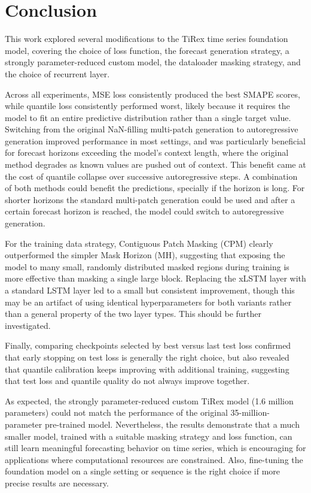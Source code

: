 \documentclass[a4paper,oneside,10pt,ngerman,english]{scrartcl}
\begin{document}
\section{Conclusion}
\label{sec:conclusion}
This work explored several modifications to the TiRex time series foundation model, covering the choice of loss function, the forecast generation strategy, a strongly parameter-reduced custom model, the dataloader masking strategy, and the choice of recurrent layer.

Across all experiments, MSE loss consistently produced the best SMAPE scores, while quantile loss consistently performed worst, likely because it requires the model to fit an entire predictive distribution rather than a single target value. Switching from the original NaN-filling multi-patch generation to autoregressive generation improved performance in most settings, and was particularly beneficial for forecast horizons exceeding the model's context length, where the original method degrades as known values are pushed out of context. This benefit came at the cost of quantile collapse over successive autoregressive steps. A combination of both methods could benefit the predictions, specially if the horizon is long. For shorter horizons the standard multi-patch generation could be used and after a certain forecast horizon is reached, the model could switch to autoregressive generation.

For the training data strategy, Contiguous Patch Masking (CPM) clearly outperformed the simpler Mask Horizon (MH), suggesting that exposing the model to many small, randomly distributed masked regions during training is more effective than masking a single large block. Replacing the xLSTM layer with a standard LSTM layer led to a small but consistent improvement, though this may be an artifact of using identical hyperparameters for both variants rather than a general property of the two layer types. This should be further investigated.

Finally, comparing checkpoints selected by best versus last test loss confirmed that early stopping on test loss is generally the right choice, but also revealed that quantile calibration keeps improving with additional training, suggesting that test loss and quantile quality do not always improve together.

As expected, the strongly parameter-reduced custom TiRex model (1.6 million parameters) could not match the performance of the original 35-million-parameter pre-trained model. Nevertheless, the results demonstrate that a much smaller model, trained with a suitable masking strategy and loss function, can still learn meaningful forecasting behavior on time series, which is encouraging for applications where computational resources are constrained. Also, fine-tuning the foundation model on a single setting or sequence is the right choice if more precise results are necessary. 
\end{document}
